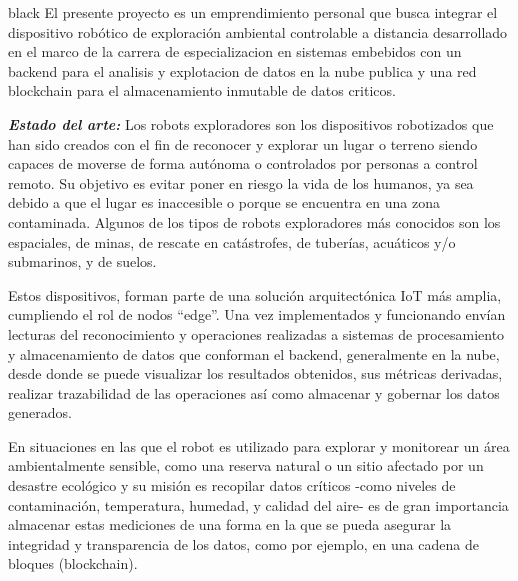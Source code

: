 \documentclass[
11pt, %
]{charter}
\begin{document}
\begin{consigna}{black} %
El presente proyecto es un emprendimiento personal que busca integrar el dispositivo robótico de exploración ambiental controlable a distancia desarrollado en el marco de la carrera de especializacion en sistemas embebidos con un backend para el analisis y explotacion de datos en la nube publica y una red blockchain para el almacenamiento inmutable de datos criticos.

\textit{\textbf{Estado del arte:}}
Los robots exploradores son los dispositivos robotizados que han sido creados con el fin de reconocer y explorar un lugar o terreno siendo capaces de moverse de forma autónoma o controlados por personas a control remoto. Su objetivo es evitar poner en riesgo la vida de los humanos, ya sea debido a que el lugar es inaccesible o porque se encuentra en una zona contaminada.
Algunos de los tipos de robots exploradores más conocidos son los espaciales, de minas, de rescate en catástrofes, de tuberías, acuáticos y/o submarinos, y de suelos.

Estos dispositivos, forman parte de una solución arquitectónica IoT más amplia, cumpliendo el rol de nodos “edge”.  Una vez implementados y funcionando envían lecturas del reconocimiento y operaciones realizadas a sistemas de procesamiento y almacenamiento de datos que conforman el backend, generalmente en la nube, desde donde se puede visualizar los resultados obtenidos, sus métricas derivadas, realizar trazabilidad de las operaciones así como almacenar y gobernar los datos generados. 

En situaciones en las que el robot es utilizado para explorar y monitorear un área ambientalmente sensible, como una reserva natural o un sitio afectado por un desastre ecológico y su misión es recopilar datos críticos -como niveles de contaminación, temperatura, humedad, y calidad del aire- es de gran importancia almacenar estas mediciones de una forma en la que se pueda asegurar la integridad y transparencia de los datos, como por ejemplo, en una cadena de bloques (blockchain).


\end{consigna}
\end{document}
